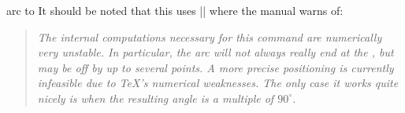 \begin{pathoperation}{arc to}{}
It should be noted that this uses |\pgfpatharcto| where the \tikzname\space manual warns of:
\begin{quote}\itshape
    The internal computations necessary for this command are numerically very unstable.
    In particular, the arc will not always really end at the ,
    but may be off by up to several points.
    A more precise positioning is currently infeasible due to \TeX's numerical weaknesses.
    The only case it works quite nicely is when the resulting angle is a multiple of $90^\circ$. 
\end{quote}
\end{pathoperation}